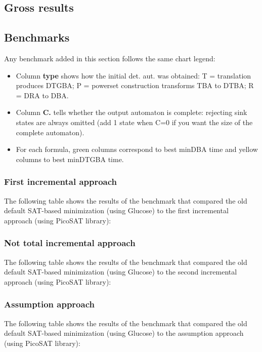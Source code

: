\begin{landscape}
\chapter{Gross results}

\section{Benchmarks}
Any benchmark added in this section follows the same chart legend:\\
\begin{itemize}
 \item Column \textbf{type} shows how the initial det. aut. was obtained: T = translation produces DTGBA;
       P = powerset construction transforms TBA to DTBA; R = DRA to DBA.
 \item Column \textbf{C.} tells whether the output automaton is complete: rejecting sink states are always
       omitted (add 1 state when C=0 if you want the size of the complete automaton).
 \item For each formula, green columns correspond to best minDBA time and yellow columns to best minDTGBA
       time.
\end{itemize}

\subsection{First incremental approach}
\label{glu_vs_incr1_complete}
The following table shows the results of the benchmark that compared the old default SAT-based minimization
(using Glucose) to the first incremental approach (using PicoSAT library):\\

\subsection{Not total incremental approach}
\label{glu_vs_incr2_complete}
The following table shows the results of the benchmark that compared the old default SAT-based minimization
(using Glucose) to the second incremental approach (using PicoSAT library):\\

\subsection{Assumption approach}
\label{glu_vs_assume_complete}
The following table shows the results of the benchmark that compared the old default SAT-based minimization
(using Glucose) to the assumption approach (using PicoSAT library):\\


\end{landscape}
